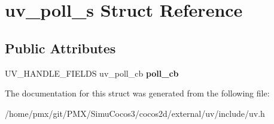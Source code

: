 \hypertarget{structuv__poll__s}{}\section{uv\+\_\+poll\+\_\+s Struct Reference}
\label{structuv__poll__s}
\subsection*{Public Attributes}
\begin{DoxyCompactItemize}
\item 
\mbox{\label{structuv__poll__s_aabafe3b973e7c46f1d3b52d977cd3b77}} 
U\+V\+\_\+\+H\+A\+N\+D\+L\+E\+\_\+\+F\+I\+E\+L\+DS uv\+\_\+poll\+\_\+cb {\bfseries poll\+\_\+cb}
\end{DoxyCompactItemize}


The documentation for this struct was generated from the following file\+:\begin{DoxyCompactItemize}
\item 
/home/pmx/git/\+P\+M\+X/\+Simu\+Cocos3/cocos2d/external/uv/include/uv.\+h\end{DoxyCompactItemize}
